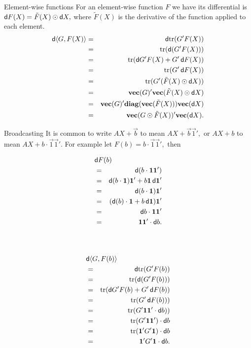 \documentclass[noamsthm]{beamer}
\begin{document}
\begin{frame}{Element-wise functions}
For an element-wise function \(F\) we have its differential is \(\mathop{}\!\mathsf d F(X) =
\tilde F(X) \odot \mathop{}\!\mathsf d X,\) where \(\tilde F(X)\) is the derivative of the
function applied to each element.
\begin{eqnarray*}
\dif\langle G, F(X) \rangle
&=& \dif\trace(G' F(X)) \\
&=& \trace(\dif(G' F(X))) \\
&=& \trace(\dif G' F(X) + G' \dif F(X)) \\
&=& \trace(G' \dif F(X)) \\
&=& \trace(G' (\tilde F(X) \hadam \dif X)) \\
&=& \vect(G)' \vect(\tilde F(X) \hadam \dif X) \\
&=& \vect(G)' \diag(\vect(\tilde F(X))) \vect(\dif X) \\
&=& \vect(G \hadam \tilde F(X))' \vect(\dif X).
\end{eqnarray*}
\end{frame}

\begin{frame}{Broadcasting}
It is common to write \(AX + \vec b\) to mean
\(AX + \vec b \vec 1',\) or \(AX + b\) to mean \(AX + b \cdot
\vec 1 \vec 1'.\) For example
let  \(F(b) = b \cdot \vec 1 \vec 1',\) then
\begin{minipage}{.45\textwidth}
\begin{eqnarray*}
\lefteqn{\dif F(b)} \\
&=& \dif(b \cdot \vec 1 \vec 1') \\
&=& \dif(b \cdot \vec 1) \vec 1' + b \vec 1 \dif \vec 1' \\
&=& \dif(b \cdot \vec 1) \vec 1' \\
&=& (\dif(b) \cdot \vec 1 + b \dif \vec 1) \vec 1' \\
&=& \dif b \cdot \vec 1  \vec 1' \\
&=& \vec 1 \vec 1' \cdot \dif b. \\
&& \\
&& \\
\end{eqnarray*}
\end{minipage}%
\begin{minipage}{.5\textwidth}
\begin{eqnarray*}
\lefteqn{\dif\langle G,F(b)\rangle} \\
&=& \dif\trace(G' F(b)) \\
&=& \trace(\dif(G' F(b))) \\
&=& \trace(\dif G' F(b) + G' \dif F(b)) \\
&=& \trace(G' \dif F(b))) \\
&=& \trace(G' \vec 1 \vec 1' \cdot \dif b)) \\
&=& \trace(G' \vec 1 \vec 1') \cdot \dif b \\
&=& \trace(\vec 1' G' \vec 1) \cdot \dif b \\
&=& \vec 1' G' \vec 1 \cdot \dif b. \\
\end{eqnarray*}
\end{minipage}
\end{frame}
\end{document}

